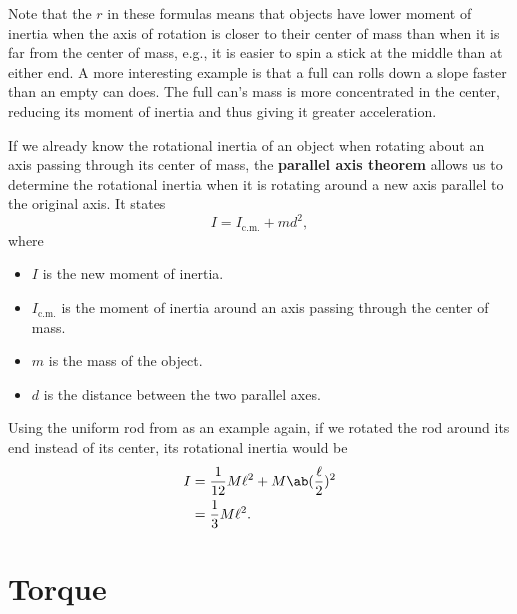 Note that the \(r\) in these formulas means that objects have lower
moment of inertia
when the axis of rotation is closer to their center of mass
than when it is far from the center of mass,
e.g., it is easier to spin a stick at the middle than at either end.
A more interesting example is that a full can rolls down a slope
faster than an empty can does.
The full can's mass is more concentrated in the center,
reducing its moment of inertia and thus giving it greater acceleration.

If we already know the rotational inertia of an object
when rotating about an axis passing through its center of mass,
the \textbf{parallel axis theorem} allows us to determine the rotational inertia
when it is rotating around a new axis parallel to the original axis.
It states
\begin{equation}
    I = I_\mathrm{c.m.} + m d^2,
\end{equation}
where
\begin{itemize}
    \item \(I\) is the new moment of inertia.
    \item \(I_\mathrm{c.m.}\) is the moment of inertia
        around an axis passing through the center of mass.
    \item \(m\) is the mass of the object.
    \item \(d\) is the distance between the two parallel axes.
\end{itemize}

Using the uniform rod from 
as an example again,
if we rotated the rod around its end instead of its center, its
rotational inertia would be
\begin{equation}
    \begin{aligned}
        I &= \frac{1}{12} M \ell^2 + M \ab(\frac{\ell}{2})^2 \\
        &= \frac{1}{3} M \ell^2.
    \end{aligned}
\end{equation}

\begin{figure}[ht]
    \centering
    
\end{figure}

\section{Torque}

